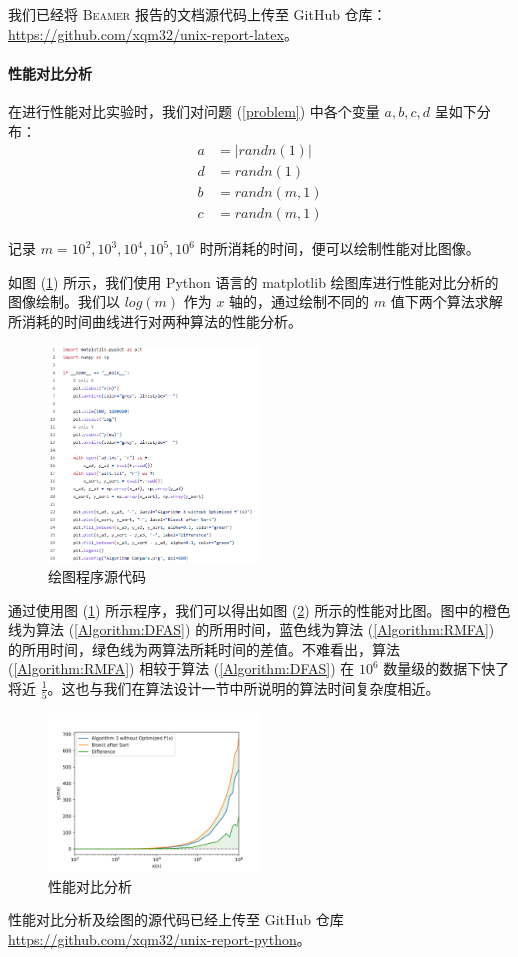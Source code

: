 我们已经将 \textsc{Beamer} 报告的文档源代码上传至 GitHub 仓库：\href{https://github.com/xqm32/unix-report-latex}{https://github.com/xqm32/unix-report-latex}。

\paragraph{性能对比分析}

在进行性能对比实验时，我们对问题 (\ref{problem}) 中各个变量 $a,b,c,d$ 呈如下分布：
\begin{align}
    a & =|randn(1)|\nonumber  \\
    d & =randn(1)\nonumber    \\
    b & =randn(m, 1)\nonumber \\
    c & =randn(m, 1)\nonumber
\end{align}

记录 $m=10^2,10^3,10^4,10^5,10^6$ 时所消耗的时间，便可以绘制性能对比图像。

如图 (\ref{Draw}) 所示，我们使用 Python 语言的 matplotlib 绘图库进行性能对比分析的图像绘制。我们以 $log(m)$ 作为 $x$ 轴的，通过绘制不同的 $m$ 值下两个算法求解所消耗的时间曲线进行对两种算法的性能分析。
\begin{figure}[htb]
    \centering
    \includegraphics[width=0.5\textwidth]{figures/py@draw.png}
    \caption{绘图程序源代码}
    \label{Draw}
\end{figure}

通过使用图 (\ref{Draw}) 所示程序，我们可以得出如图 (\ref{Compare}) 所示的性能对比图。图中的橙色线为算法 (\ref{Algorithm:DFAS}) 的所用时间，蓝色线为算法 (\ref{Algorithm:RMFA}) 的所用时间，绿色线为两算法所耗时间的差值。不难看出，算法 (\ref{Algorithm:RMFA}) 相较于算法 (\ref{Algorithm:DFAS}) 在 $10^6$ 数量级的数据下快了将近 $\frac{1}{5}$。这也与我们在算法设计一节中所说明的算法时间复杂度相近。
\begin{figure}[htb]
    \centering
    \includegraphics[width=0.5\textwidth]{figures/Compare.png}
    \caption{性能对比分析}
    \label{Compare}
\end{figure}

性能对比分析及绘图的源代码已经上传至 GitHub 仓库 \href{https://github.com/xqm32/unix-report-python}{https://github.com/xqm32/unix-report-python}。